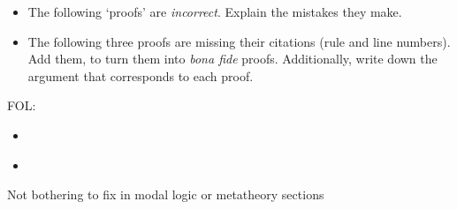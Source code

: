 \documentclass{article}
\begin{document}
\begin{itemize}
\item

The following `proofs' are \emph{incorrect}. Explain the mistakes they make.
\begin{pf}
\LEM
\open
\close
\open
\close
{}
\end{pf}


\item
The following three proofs are missing their citations (rule and line numbers). Add them, to turn them into \emph{bona fide} proofs. Additionally, write down the argument that corresponds to each proof.


\begin{pf}
\open
\close
{}%
\open
\close
{}%
\end{pf}
\end{itemize}





\noindent FOL:
\begin{itemize}
\item 

\begin{pf}
	\open
		\open
		\close
	\close
\end{pf}

\item 
\begin{pf}
	\open
		\open
		\close
	\close
\end{pf}
\end{itemize}


Not bothering to fix in modal logic or metatheory sections
\end{document}
